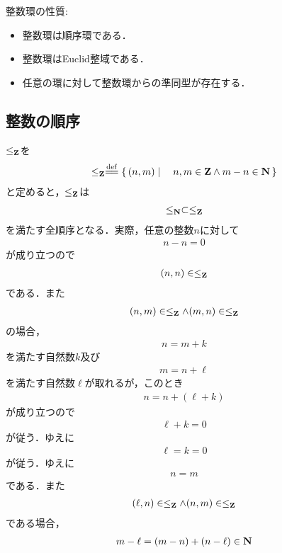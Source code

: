 	整数環の性質:
	\begin{itemize}
		\item 整数環は順序環である．
		\item 整数環はEuclid整域である．
		\item 任意の環に対して整数環からの準同型が存在する．
	\end{itemize}
	
\subsection{整数の順序}
	$\leq_{\mathbf{Z}}$を
	\begin{align}
		\leq_{\Z} \defeq \Set{(n,m)}{n,m \in \Z \wedge m - n \in \Natural}
	\end{align}
	と定めると，$\leq_{\mathbf{Z}}$は
	\begin{align}
		\leq_{\mathbf{N}} \subset \leq_{\mathbf{Z}}
	\end{align}
	を満たす全順序となる．実際，任意の整数$n$に対して
	\begin{align}
		n - n = 0
	\end{align}
	が成り立つので
	\begin{align}
		(n,n) \in \leq_{\mathbf{Z}}
	\end{align}
	である．また
	\begin{align}
		(n,m) \in \leq_{\mathbf{Z}} \wedge (m,n) \in \leq_{\mathbf{Z}}
	\end{align}
	の場合，
	\begin{align}
		n = m + k
	\end{align}
	を満たす自然数$k$及び
	\begin{align}
		m = n + \ell
	\end{align}
	を満たす自然数$\ell$が取れるが，このとき
	\begin{align}
		n = n + (\ell + k)
	\end{align}
	が成り立つので
	\begin{align}
		\ell + k = 0
	\end{align}
	が従う．ゆえに
	\begin{align}
		\ell = k = 0
	\end{align}
	が従う．ゆえに
	\begin{align}
		n = m
	\end{align}
	である．また
	\begin{align}
		(\ell,n) \in \leq_{\mathbf{Z}} \wedge (n,m) \in \leq_{\mathbf{Z}}
	\end{align}
	である場合，
	\begin{align}
		m - \ell = (m - n) + (n - \ell) \in \mathbf{N}
	\end{align}

